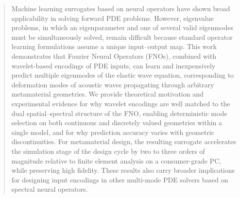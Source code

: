 \documentclass[preprint,review,12pt,numafflabel]{elsarticle}
\begin{document}
\begin{frontmatter}
\author[Mech]{Han Zhang}
\author[Caltech]{Alexander Ogren}
\author[Comp]{Cynthia Rudin}
\author[Mech]{\protect\\Johann Guilleminot}
\author[Mech]{L. Catherine Brinson}
\begin{abstract}
Machine learning surrogates based on neural operators have shown broad applicability in solving forward PDE problems. However, eigenvalue problems, in which an eigenparameter and one of several valid eigenmodes must be simultaneously solved, remain difficult because standard operator learning formulations assume a unique input--output map. This work demonstrates that Fourier Neural Operators (FNOs), combined with wavelet-based encodings of PDE inputs, can learn and inexpensively predict multiple eigenmodes of the elastic wave equation, corresponding to deformation modes of acoustic waves propagating through arbitrary metamaterial geometries. We provide theoretical motivation and experimental evidence for why wavelet encodings are well matched to the dual spatial--spectral structure of the FNO, enabling deterministic mode selection on both continuous and discretely valued geometries within a single model, and for why prediction accuracy varies with geometric discontinuities. For metamaterial design, the resulting surrogate accelerates the simulation stage of the design cycle by two to three orders of magnitude relative to finite element analysis on a consumer-grade PC, while preserving high fidelity. These results also carry broader implications for designing input encodings in other multi-mode PDE solvers based on spectral neural operators.


\end{abstract}
\end{frontmatter}
\end{document}
